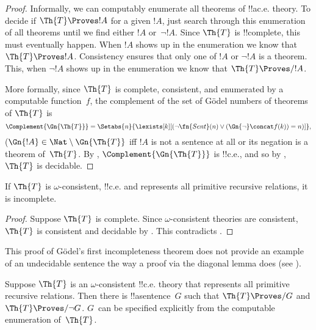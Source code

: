 \documentclass[../../../include/open-logic-section]{subfiles}
\begin{document}
\begin{proof}
  Informally, we can computably enumerate all theorems of !!a{c.e.}
  theory. To decide if $\Th{T} \Proves !A$ for a given $!A$, just
  search through this enumeration of all theorems until we find either
  $!A$ or~$\lnot !A$. Since $\Th{T}$ is !!{complete}, this must
  eventually happen. When $!A$ shows up in the enumeration we
  know that $\Th{T} \Proves !A$. Consistency ensures that only one of $!A$ or
  $\lnot !A$ is a theorem. This, when $\lnot !A$ shows up in the enumeration we
  know that $\Th{T} \Proves/ !A$.

  More formally, since $\Th{T}$ is complete, consistent, and
  enumerated by a computable function~$f$, the
  complement of the set of G\"odel numbers of theorems of $\Th{T}$ is
  \[\Complement{\Gn{\Th{T}}} = \Setabs{n}{\lexists[k][(\lnot
  \fn{Sent}(n) \lor (\Gn{\lnot} \concat f(k)) = n)]},\] ($\Gn{!A} \in
  \Nat \setminus \Gn{\Th{T}}$ iff $!A$ is not a sentence at all or its
  negation is a theorem of~$\Th{T}$. By
  , $\Complement{\Gn{\Th{T}}}$
  is !!{c.e.}, and so by , $\Th{T}$
  is decidable.
\end{proof}

\begin{cor}
  If\/ $\Th{T}$ is $\omega$-consistent, !!{c.e.} and represents all
  primitive recursive relations, it is incomplete.
\end{cor}

\begin{proof}
  Suppose $\Th{T}$ is complete. Since $\omega$-consistent theories
  are consistent, $\Th{T}$ is consistent and decidable by
  . This contradicts
  .
\end{proof}

This proof of G\"odel's first incompleteness theorem does not provide
an example of an undecidable sentence the way a proof via the diagonal
lemma does (see ).

\begin{thm} Suppose $\Th{T}$ is an $\omega$-consistent
  !!{c.e.} theory that represents all primitive recursive relations.
  Then there is !!a{sentence}~$G$ such that $\Th{T} \Proves/ G$ and
  $\Th{T} \Proves/ \lnot G$. $G$~can be specified explicitly from the
  computable enumeration of\/~$\Th{T}$.
\end{thm}
\end{document}
